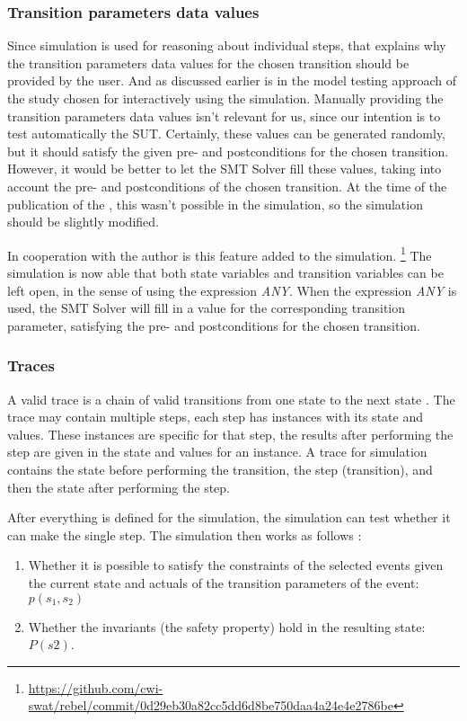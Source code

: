 \subsubsection*{Transition parameters data values}
Since simulation is used for reasoning about individual steps, that explains why the transition parameters data values for the chosen transition should be provided by the user. And as discussed earlier is in the model testing approach of the study \cite[p.6]{stoel_storm_vinju_bosman_2016} chosen for interactively using the simulation. Manually providing the transition parameters data values isn't relevant for us, since our intention is to test automatically the SUT. Certainly, these values can be generated randomly, but it should satisfy the given pre- and postconditions for the chosen transition. However, it would be better to let the SMT Solver fill these values, taking into account the pre- and postconditions of the chosen transition. At the time of the publication of the \cite{stoel_storm_vinju_bosman_2016}, this wasn't possible in the simulation, so the simulation should be slightly modified.

In cooperation with the author is this feature added to the simulation. \footnote{\url{https://github.com/cwi-swat/rebel/commit/0d29eb30a82cc5dd6d8be750daa4a24e4e2786be}} The simulation is now able that both state variables and transition variables can be left open, in the sense of using the expression \textit{ANY}. When the expression \textit{ANY} is used, the SMT Solver will fill in a value for the corresponding transition parameter, satisfying the pre- and postconditions for the chosen transition. 

\subsubsection*{Traces}
A valid trace is a chain of valid transitions from one state to the next state \cite[p.5]{stoel_storm_vinju_bosman_2016}. The trace may contain multiple steps, each step has instances with its state and values. These instances are specific for that step, the results after performing the step are given in the state and values for an instance. A trace for simulation contains the state before performing the transition, the step (transition), and then the state after performing the step. 

After everything is defined for the simulation, the simulation can test whether it can make the single step. The simulation then works as follows \cite[p.6]{stoel_storm_vinju_bosman_2016}:
\begin{enumerate}
\item Whether it is possible to satisfy the constraints of the selected events given the current state and actuals of the transition parameters of the event: $p(s_{1}, s_{2})$
\item Whether the invariants (the safety property) hold in the resulting state: $P(s2)$.
\end{enumerate}

